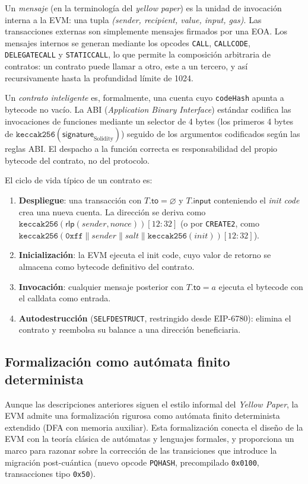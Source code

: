 Un \emph{mensaje} (en la terminología del \emph{yellow paper}) es la unidad de invocación interna a la EVM: una tupla \emph{(sender, recipient, value, input, gas)}. Las transacciones externas son simplemente mensajes firmados por una EOA. Los mensajes internos se generan mediante los opcodes \texttt{CALL}, \texttt{CALLCODE}, \texttt{DELEGATECALL} y \texttt{STATICCALL}, lo que permite la composición arbitraria de contratos: un contrato puede llamar a otro, este a un tercero, y así recursivamente hasta la profundidad límite de 1024.

Un \emph{contrato inteligente} es, formalmente, una cuenta cuyo \texttt{codeHash} apunta a bytecode no vacío. La ABI (\emph{Application Binary Interface}) estándar codifica las invocaciones de funciones mediante un selector de 4 bytes (los primeros 4 bytes de $\texttt{keccak256}(\textsf{signature}_{\text{Solidity}})$) seguido de los argumentos codificados según las reglas ABI. El despacho a la función correcta es responsabilidad del propio bytecode del contrato, no del protocolo.

El ciclo de vida típico de un contrato es:
\begin{enumerate}
  \item \textbf{Despliegue}: una transacción con $T.\textsf{to} = \varnothing$ y $T.\textsf{input}$ conteniendo el \emph{init code} crea una nueva cuenta. La dirección se deriva como $\texttt{keccak256}(\textsf{rlp}(sender, nonce))[12{:}32]$ (o por \texttt{CREATE2}, como $\texttt{keccak256}(\texttt{0xff} \| sender \| salt \| \texttt{keccak256}(init))[12{:}32]$).
  \item \textbf{Inicialización}: la EVM ejecuta el init code, cuyo valor de retorno se almacena como bytecode definitivo del contrato.
  \item \textbf{Invocación}: cualquier mensaje posterior con $T.\textsf{to} = a$ ejecuta el bytecode con el calldata como entrada.
  \item \textbf{Autodestrucción} (\texttt{SELFDESTRUCT}, restringido desde EIP-6780): elimina el contrato y reembolsa su balance a una dirección beneficiaria.
\end{enumerate}

\subsection{Formalización como autómata finito determinista}
\label{sec:evm_fsm}

Aunque las descripciones anteriores siguen el estilo informal del \emph{Yellow Paper}, la EVM admite una formalización rigurosa como autómata finito determinista extendido (DFA con memoria auxiliar). Esta formalización conecta el diseño de la EVM con la teoría clásica de autómatas y lenguajes formales, y proporciona un marco para razonar sobre la corrección de las transiciones que introduce la migración post-cuántica (nuevo opcode \texttt{PQHASH}, precompilado \texttt{0x0100}, transacciones tipo \texttt{0x50}).

